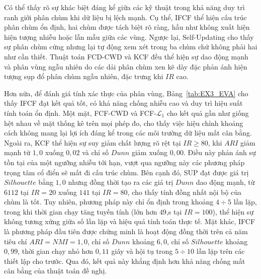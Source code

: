 \documentclass[a4paper,oneside]{book} %
\theoremstyle{plain}
\theoremstyle{plain}
\theoremstyle{nonumberplain}
\begin{document}
Có thể thấy rõ sự khác biệt đáng kể giữa các kỹ thuật trong khả năng duy trì ranh giới phân chùm khi dữ liệu bị lệch mạnh. 
Cụ thể, IFCF thể hiện cấu trúc phân chùm ổn định, hai chùm được tách biệt rõ ràng, hầu như không xuất hiện hiện tượng nhiễu hoặc lẫn mẫu giữa các vùng. Ngược lại, Self-Updating cho thấy sự phân chùm cứng nhưng lại tự động xem xét trong ba chùm chứ không phải hai như cần thiết. Thuật toán FCD-CWD và KCF đều thể hiện sự dao động mạnh và phân vùng ngẫu nhiên do các dải phân chùm xen kẽ dày đặc phản ánh hiện tượng sụp đổ phân chùm ngẫu nhiên, đặc trưng khi $IR$ cao.


Hơn nữa, để đánh giá tính xác thực của phân vùng, Bảng~\ref{tab:EX3_EVA} cho thấy IFCF đạt kết quả tốt, có khả năng chống nhiễu cao và duy trì hiệu suất tính toán ổn định. 
Một mặt, FCF-CWD và FCF-$\mathcal{L}_1$ cho kết quả gần như giống hệt nhau về mặt thống kê trên mọi phép đo, cho thấy việc hiệu chỉnh khoảng cách không mang lại lợi ích đáng kể trong các môi trường dữ liệu mất cân bằng. Ngoài ra, KCF thể hiện sự suy giảm chất lượng rõ rệt tại $IR \ge 80$, khi $ARI$ giảm mạnh từ $1{,}0$ xuống $0{,}02$ và chỉ số $Dunn$ giảm xuống $0{,}00$. Điều này phản ánh sự tồn tại của một ngưỡng nhiễu tới hạn, vượt qua ngưỡng này các phương pháp trọng tâm cổ điển sẽ mất đi cấu trúc chùm.
Bên cạnh đó, SUP đạt được giá trị $Silhouette$ bằng $1{,}0$ nhưng đồng thời tạo ra các giá trị $Dunn$ dao động mạnh, từ $6112$ tại $IR=20$ xuống $141$ tại $IR=80$, cho thấy tính đồng nhất nội bộ của chùm là tốt. Tuy nhiên, phương pháp này chỉ ổn định trong khoảng $4\div5$ lần lặp, trong khi thời gian chạy tăng tuyến tính (lớn hơn $49$,s tại $IR=100$), thể hiện sự không tương xứng giữa số lần lặp và hiệu quả tính toán thực tế.
Mặt khác, IFCF là phương pháp đầu tiên được chứng minh là hoạt động đồng thời trên cả năm tiêu chí $ARI=NMI=1{,}0$, chỉ số $Dunn$ khoảng $6{,}0$, chỉ số $Silhouette$ khoảng $0{,}99$, thời gian chạy nhỏ hơn $0{,}11$ giây và hội tụ trong $5\div10$ lần lặp trên các thiết lập cho trước. Qua đó, kết quả này khẳng định hơn khả năng chống mất cân bằng của thuật toán đề nghị.
\end{document}
